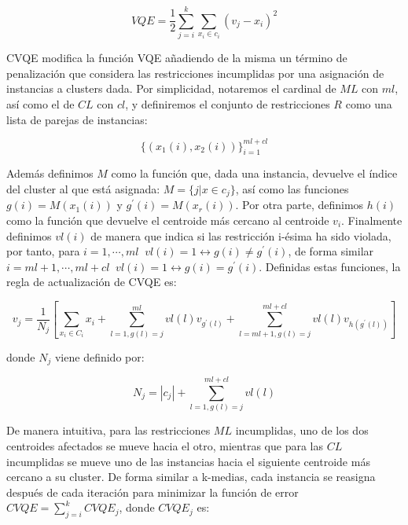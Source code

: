 \begin{equation}
VQE = \frac{1}{2} \sum_{j = i}^{k} \sum_{x_i \in c_i} (v_j - x_i)^2
\label{eqn28}
\end{equation}

\acs{CVQE} modifica la función \acs{VQE} añadiendo de la misma un término de penalización que considera las restricciones incumplidas por una asignación de instancias a clusters dada. Por simplicidad, notaremos el cardinal de $ML$ con $ml$, así como el de $CL$ con $cl$, y definiremos el conjunto de restricciones $R$ como una lista de parejas de instancias: 

\begin{equation}
\{(x_1(i), x_2(i))\}_{i=1}^{ml+cl}
\label{eqn29}
\end{equation}

Además definimos $M$ como la función que, dada una instancia, devuelve el índice del cluster al que está asignada: $M = \{j | x \in c_j\}$, así como las funciones $g(i) = M(x_1(i))$ y $g^\prime(i) = M(x_r(i))$. Por otra parte, definimos $h(i)$ como la función que devuelve el centroide más cercano al centroide $v_i$. Finalmente definimos $vl(i)$ de manera que indica si las restricción i-ésima ha sido violada, por tanto, para $i = 1, \cdots , ml \;\; vl(i) = 1 \leftrightarrow g(i) \neq g^\prime(i)$, de forma similar $i = ml + 1, \cdots , ml + cl \;\; vl(i) = 1 \leftrightarrow g(i) = g^\prime(i)$. Definidas estas funciones, la regla de actualización de \acs{CVQE} es:

\begin{equation}
v_j = \frac{1}{N_j} \left[ \sum_{x_i \in C_i}x_i + 
\sum_{l=1,g(l) = j}^{ml} vl(l) v_{g^\prime(l)} + 
\sum_{l=ml + 1,g(l) = j}^{ml + cl} vl(l) v_{h(g^\prime(l))}
\right]
\label{eqn30}
\end{equation}

donde $N_j$ viene definido por: 

\begin{equation}
N_j = |c_j| + \sum_{l=1,g(l) = j}^{ml + cl} vl(l)
\label{eqn31}
\end{equation}

De manera intuitiva, para las restricciones $ML$ incumplidas, uno de los dos centroides afectados se mueve hacia el otro, mientras que para las $CL$ incumplidas se mueve uno de las instancias hacia el siguiente centroide más cercano a su cluster. De forma similar a k-medias, cada instancia se reasigna después de cada iteración para minimizar la función de error $CVQE = \sum_{j=i}^{k} CVQE_j$, donde $CVQE_j$ es:

